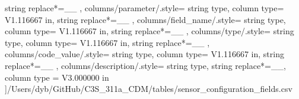 \begin{landscape}
{            string replace*={_}{\_}
        },
    columns/parameter/.style={
            string type, 
            column type= V{1.116667 in}, 
            string replace*={_}{\_}
        },
    columns/field_name/.style={
            string type, 
            column type= V{1.116667 in}, 
            string replace*={_}{\_}
        },
    columns/type/.style={
            string type, 
            column type= V{1.116667 in}, 
            string replace*={_}{\_}
        },
    columns/code_value/.style={
            string type, 
            column type= V{1.116667 in}, 
            string replace*={_}{\_}
        },
    columns/description/.style={
            string type, 
            string replace*={_}{\_},
            column type = V{3.000000 in}
        }
    ]{/Users/dyb/GitHub/C3S_311a_CDM/tables/sensor_configuration_fields.csv}
\end{landscape}
